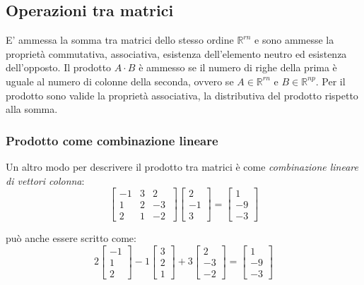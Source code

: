 \documentclass[x11names]{article}
\begin{document}
\subsection{Operazioni tra matrici}
E' ammessa la somma tra matrici dello stesso ordine $\mathbb{R}^{rn}$ e sono ammesse la proprietà commutativa, associativa, esistenza dell'elemento neutro ed esistenza dell’opposto. Il prodotto $A\cdot B$ è ammesso se il numero di righe della prima è uguale al numero di colonne della seconda, ovvero se $A \in \mathbb{R}^{rn}$ e $B\in \mathbb{R}^{np}$. Per il prodotto sono valide la proprietà associativa, la distributiva del prodotto rispetto alla somma.

\subsubsection{Prodotto come combinazione lineare}
Un altro modo per descrivere il prodotto tra matrici è come \textit{combinazione lineare di vettori colonna}:
\[
\begin{bmatrix}
    -1 & 3 & 2 \\
    1 & 2 & -3 \\
    2 & 1 & -2 \
\end{bmatrix}
\begin{bmatrix}
2 \\ -1 \\ 3
\end{bmatrix}
=
\begin{bmatrix}
1 \\ -9  \\ -3
\end{bmatrix}
\] 

può anche essere scritto come:
\[
2 \begin{bmatrix}
-1 \\ 1 \\ 2
\end{bmatrix}
-1
\begin{bmatrix}
3 \\ 2   \\ 1 
\end{bmatrix}
+3
\begin{bmatrix}
2 \\ -3  \\ -2 
\end{bmatrix}
= 
\begin{bmatrix}
1 \\-9  \\-3 
\end{bmatrix}
\] 
\end{document}

